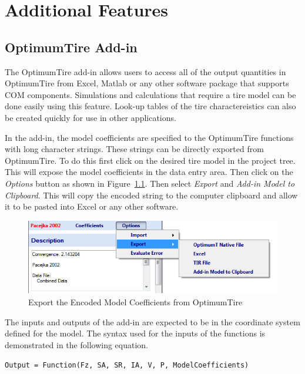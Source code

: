 
\chapter{Additional Features}
\setcounter{figure}{0}
\setcounter{table}{0}

\label{sec:AdditionalFeatures}
\section{OptimumTire Add-in}
\label{sec:OptimumTAddin}

The OptimumTire add-in allows users to access all of the output quantities in OptimumTire from Excel, Matlab or any other software package that supports COM components. Simulations and calculations that require a tire model can be done easily using this feature. Look-up tables of the tire charactereistics can also be created quickly for use in other applications. 

In the add-in, the model coefficients are specified to the OptimumTire functions with long character strings. These strings can be directly exported from OptimumTire. To do this first click on the desired tire model in the project tree. This will expose the model coefficients in the data entry area. Then click on the \textit{Options} button as shown in Figure~\ref{fig:AddinExport}. Then select \textit{Export} and \textit{Add-in Model to Clipboard}. This will copy the encoded string to the computer clipboard and allow it to be pasted into Excel or any other software.

\begin{figure}[H]
	\centering
		\includegraphics[width=1.0\textwidth]{AddinExport.png}
	\caption{Export the Encoded Model Coefficients from OptimumTire}
	\label{fig:AddinExport}
\end{figure}

The inputs and outputs of the add-in are expected to be in the coordinate system defined for the model. The syntax used for the inputs of the functions is demonstrated in the following equation.

\begin{center}
\texttt{Output = Function(Fz, SA, SR, IA, V, P, ModelCoefficients)}
\end{center}


